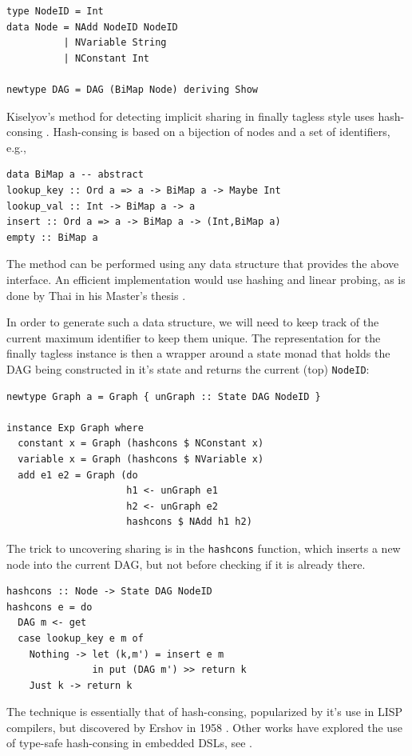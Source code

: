 \documentclass[runningheads]{llncs}
\begin{document}
\begin{verbatim}
type NodeID = Int
data Node = NAdd NodeID NodeID
          | NVariable String
          | NConstant Int

newtype DAG = DAG (BiMap Node) deriving Show
\end{verbatim}

Kiselyov's method for detecting implicit sharing in finally tagless style uses
hash-consing \cite{kiselyov:sharing}. Hash-consing is based on a bijection of
nodes and a set of identifiers, e.g.,

\begin{verbatim}
data BiMap a -- abstract
lookup_key :: Ord a => a -> BiMap a -> Maybe Int
lookup_val :: Int -> BiMap a -> a
insert :: Ord a => a -> BiMap a -> (Int,BiMap a)
empty :: BiMap a
\end{verbatim}

The method can be performed using any data structure that provides the above
interface. An efficient implementation would use hashing and linear probing, as
is done by Thai in his Master's thesis \cite{thai2021type}.

In order to generate such a data structure, we will need to keep track of the
current maximum identifier to keep them unique. The representation for the
finally tagless instance is then a wrapper around a state monad that holds the
DAG being constructed in it's state and returns the current (top)
\texttt{NodeID}:

\begin{verbatim}
newtype Graph a = Graph { unGraph :: State DAG NodeID }

instance Exp Graph where
  constant x = Graph (hashcons $ NConstant x)
  variable x = Graph (hashcons $ NVariable x)
  add e1 e2 = Graph (do
                     h1 <- unGraph e1
                     h2 <- unGraph e2
                     hashcons $ NAdd h1 h2)
\end{verbatim}

The trick to uncovering sharing is in the
\texttt{hashcons} function, which inserts a new node into the current DAG, but not
before checking if it is already there.
\begin{verbatim}
hashcons :: Node -> State DAG NodeID
hashcons e = do
  DAG m <- get
  case lookup_key e m of
    Nothing -> let (k,m') = insert e m
               in put (DAG m') >> return k
    Just k -> return k
\end{verbatim}

The technique is essentially that of hash-consing, popularized by it's use in
LISP compilers, but discovered by Ershov in 1958 \cite{ershov1958:consing}.
Other works have explored the use of type-safe hash-consing in embedded DSLs,
see \cite{filliatre:typesafeconsing}.
\end{document}
